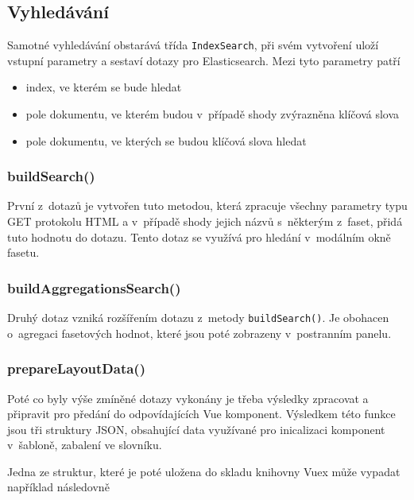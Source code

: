 \subsection{Vyhledávání}
Samotné vyhledávání obstarává třída \texttt{IndexSearch}, při svém vytvoření uloží vstupní parametry a sestaví dotazy pro Elasticsearch. Mezi tyto parametry patří
\begin{itemize}
    \item index, ve kterém se bude hledat
    \item pole dokumentu, ve kterém budou v~případě shody zvýrazněna klíčová slova
    \item pole dokumentu, ve kterých se budou klíčová slova hledat
\end{itemize}
\subsubsection*{buildSearch()}
První z~dotazů je vytvořen tuto metodou, která zpracuje všechny parametry typu GET protokolu HTML a v~případě shody jejich názvů s~některým z~faset, přidá tuto hodnotu do dotazu. Tento dotaz se využívá pro hledání v~modálním okně fasetu. 

\subsubsection*{buildAggregationsSearch()}
Druhý dotaz vzniká rozšířením dotazu z~metody \texttt{buildSearch()}. Je obohacen o~agregaci fasetových hodnot, které jsou poté zobrazeny v~postranním panelu.

\subsubsection*{prepareLayoutData()}
Poté co byly výše zmíněné dotazy vykonány je třeba výsledky zpracovat a připravit pro předání do odpovídajících Vue komponent. Výsledkem této funkce jsou tři struktury JSON, obsahující data využívané pro inicalizaci komponent v~šabloně, zabalení ve slovníku.

Jedna ze struktur, které je poté uložena do skladu knihovny Vuex může vypadat například následovně

